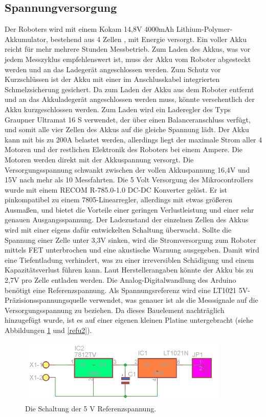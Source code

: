 \documentclass[a4paper,bibtotoc,oneside]{scrbook}
\begin{document}
\subsection{Spannungversorgung}\thispagestyle{empty}
Der Roboters wird mit einem Kokam 14,8V 4000mAh Lithium-Polymer-Akkumulator, bestehend aus 4 Zellen \cite{kokam}, mit Energie versorgt. Ein voller Akku reicht für mehr mehrere Stunden Messbetrieb. Zum Laden des Akkus, was vor jedem Messzyklus empfehlenswert ist, muss der Akku vom Roboter abgesteckt werden und an das Ladegerät angeschlossen werden. Zum Schutz vor Kurzschlüssen ist der Akku mit einer im Anschlusskabel integrierten Schmelzsicherung gesichert. Da zum Laden der Akku aus dem Roboter entfernt und an das Akkuladegerät angeschlossen werden muss, könnte versehentlich der Akku kurzgeschlossen werden. Zum Laden wird ein Laderegler des Typs Graupner Ultramat 16 S verwendet, der über einen Balanceranschluss verfügt, und somit alle vier Zellen des Akkus auf die gleiche Spannung lädt. 
Der Akku kann mit bis zu 200A belastet werden, allerdings liegt der maximale Strom aller 4 Motoren und der restlichen Elektronik des Roboters bei einem Ampere. Die Motoren werden direkt mit der Akkuspannung versorgt. Die Versorgungsspannung schwankt zwischen der vollen Akkuspannung 16,4V und 15V nach mehr als 10 Messfahrten.
Die 5 Volt Versorgung des Mikrocontrollers wurde mit einem RECOM R-785.0-1.0 DC-DC Konverter \cite{ref5} gelöst. Er ist pinkompatibel zu einem 7805-Linearregler, allerdings mit etwas größeren Ausmaßen, und bietet die Vorteile einer geringen Verlustleistung und einer sehr genauen Ausgangsspannung. 
Der Ladezustand der einzelnen Zellen des Akkus wird mit einer eigens dafür entwickelten Schaltung überwacht. Sollte die Spannung einer Zelle unter 3,3V sinken, wird die Stromversorgung zum Roboter mittels FET unterbrochen und eine akustische Warnung ausgegeben. Damit wird eine Tiefentladung verhindert, was zu einer irreversiblen Schädigung und einem Kapazitätsverlust führen kann. Laut Herstellerangaben könnte der Akku bis zu 2,7V pro Zelle entladen werden.
Die Analog-Digitalwandlung des Arduino benötigt eine Referenzspannung. Als Spannungsreferenz wird eine LT1021 5V-Präzisionsspannungsquelle \cite{lt1021} verwendet, was genauer ist als die Messsignale auf die Versorgungsspannung zu beziehen. Da dieses Bauelement nachträglich hinzugefügt wurde, ist es auf einer eigenen kleinen Platine untergebracht (siehe Abbildungen \ref{refu} und \ref{refu2}).

\begin{figure}[htbp]
\centering
\includegraphics[width=100mm]{img/refu.png}
\caption{Die Schaltung der 5 V Referenzspannung.}\label{refu}
\end{figure}
\end{document}

